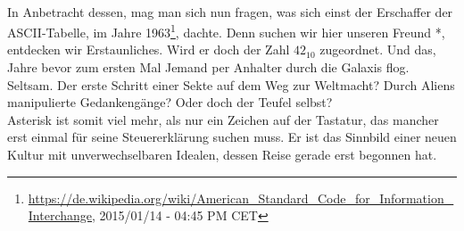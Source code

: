 \\
In Anbetracht dessen, mag man sich nun fragen, was sich einst der Erschaffer der ASCII-Tabelle, im Jahre 1963\footnote{\url{https://de.wikipedia.org/wiki/American_Standard_Code_for_Information_Interchange}, 2015/01/14 - 04:45 PM CET}, dachte. Denn suchen wir hier unseren Freund *, entdecken wir Erstaunliches. Wird er doch der Zahl $42_{10}$ zugeordnet. Und das, Jahre bevor zum ersten Mal Jemand per Anhalter durch die Galaxis flog. Seltsam. Der erste Schritt einer Sekte auf dem Weg zur Weltmacht? Durch Aliens manipulierte Gedankengänge? Oder doch der Teufel selbst?
\\
Asterisk ist somit viel mehr, als nur ein Zeichen auf der Tastatur, das mancher erst einmal für seine Steuererklärung suchen muss. Er ist das Sinnbild einer neuen Kultur mit unverwechselbaren Idealen, dessen Reise gerade erst begonnen hat.

